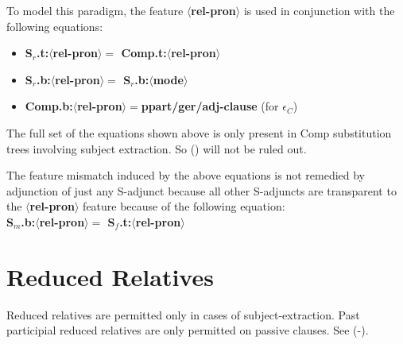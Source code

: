
To model this paradigm, the feature {\bf $\langle$rel-pron$\rangle$} is used in
conjunction with the following equations:

\begin{itemize}
\item {\bf S$_{r}$.t:$\langle$rel-pron$\rangle =$ Comp.t:$\langle$rel-pron$\rangle$}
\item {\bf S$_{r}$.b:$\langle$rel-pron$\rangle =$ S$_{r}$.b:$\langle$mode$\rangle$}
\item {\bf Comp.b:$\langle$rel-pron$\rangle =$ppart/ger/adj-clause}
(for $\epsilon$$_{C}$)
\end{itemize}

The full set of the equations shown above is only present in Comp
substitution trees involving subject extraction. So () will
not be ruled out.


The feature mismatch induced by the above equations 
is not remedied by adjunction of just any S-adjunct
because all other S-adjuncts
are transparent to the {\bf $\langle$rel-pron$\rangle$} feature
because of the following equation:\\
{\bf S$_{m}$.b:$\langle$rel-pron$\rangle =$ S$_{f}$.t:$\langle$rel-pron$\rangle$}


\section{Reduced Relatives}
Reduced relatives are permitted only in cases of subject-extraction.
Past participial reduced relatives are only permitted on passive
clauses.
See (-).


